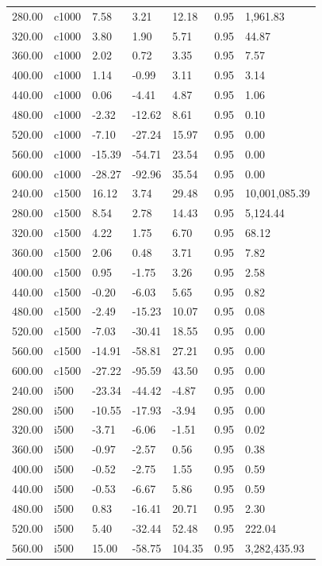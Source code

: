 \documentclass[
  man,floatsintext]{apa6}
\begin{document}
\begin{center}
\begin{ThreePartTable}
{\begin{longtable}{lllllll}
280.00 & c1000 & 7.58 & 3.21 & 12.18 & 0.95 & 1,961.83\\
320.00 & c1000 & 3.80 & 1.90 & 5.71 & 0.95 & 44.87\\
360.00 & c1000 & 2.02 & 0.72 & 3.35 & 0.95 & 7.57\\
400.00 & c1000 & 1.14 & -0.99 & 3.11 & 0.95 & 3.14\\
440.00 & c1000 & 0.06 & -4.41 & 4.87 & 0.95 & 1.06\\
480.00 & c1000 & -2.32 & -12.62 & 8.61 & 0.95 & 0.10\\
520.00 & c1000 & -7.10 & -27.24 & 15.97 & 0.95 & 0.00\\
560.00 & c1000 & -15.39 & -54.71 & 23.54 & 0.95 & 0.00\\
600.00 & c1000 & -28.27 & -92.96 & 35.54 & 0.95 & 0.00\\
240.00 & c1500 & 16.12 & 3.74 & 29.48 & 0.95 & 10,001,085.39\\
280.00 & c1500 & 8.54 & 2.78 & 14.43 & 0.95 & 5,124.44\\
320.00 & c1500 & 4.22 & 1.75 & 6.70 & 0.95 & 68.12\\
360.00 & c1500 & 2.06 & 0.48 & 3.71 & 0.95 & 7.82\\
400.00 & c1500 & 0.95 & -1.75 & 3.26 & 0.95 & 2.58\\
440.00 & c1500 & -0.20 & -6.03 & 5.65 & 0.95 & 0.82\\
480.00 & c1500 & -2.49 & -15.23 & 10.07 & 0.95 & 0.08\\
520.00 & c1500 & -7.03 & -30.41 & 18.55 & 0.95 & 0.00\\
560.00 & c1500 & -14.91 & -58.81 & 27.21 & 0.95 & 0.00\\
600.00 & c1500 & -27.22 & -95.59 & 43.50 & 0.95 & 0.00\\
240.00 & i500 & -23.34 & -44.42 & -4.87 & 0.95 & 0.00\\
280.00 & i500 & -10.55 & -17.93 & -3.94 & 0.95 & 0.00\\
320.00 & i500 & -3.71 & -6.06 & -1.51 & 0.95 & 0.02\\
360.00 & i500 & -0.97 & -2.57 & 0.56 & 0.95 & 0.38\\
400.00 & i500 & -0.52 & -2.75 & 1.55 & 0.95 & 0.59\\
440.00 & i500 & -0.53 & -6.67 & 5.86 & 0.95 & 0.59\\
480.00 & i500 & 0.83 & -16.41 & 20.71 & 0.95 & 2.30\\
520.00 & i500 & 5.40 & -32.44 & 52.48 & 0.95 & 222.04\\
560.00 & i500 & 15.00 & -58.75 & 104.35 & 0.95 & 3,282,435.93\\

\end{longtable}}
\end{ThreePartTable}
\end{center}
\end{document}
